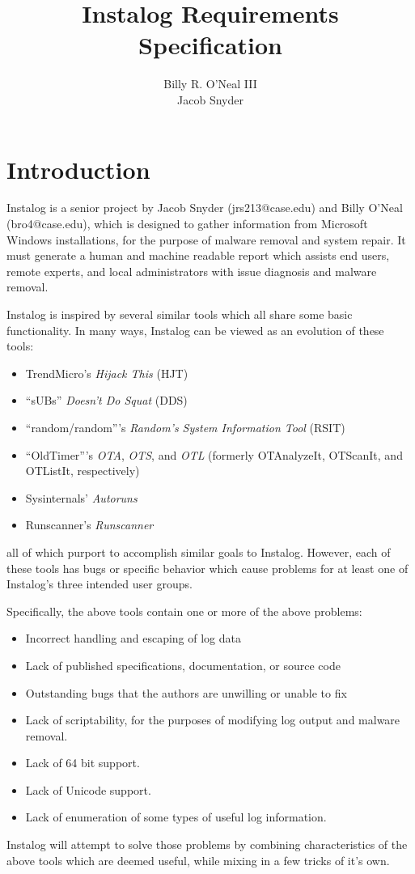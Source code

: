 \documentclass[letterpaper,12pt]{article}
\title{Instalog Requirements Specification}
\author{
Billy R. O'Neal III \\
Jacob Snyder
}
\begin{document}
\maketitle

\section{Introduction}
Instalog is a senior project by Jacob Snyder (jrs213@case.edu) and Billy O'Neal
(bro4@case.edu), which is designed to gather information from Microsoft Windows
installations, for the purpose of malware removal and system repair.  It must
generate a human and machine readable report which assists end users, remote
experts, and local administrators with issue diagnosis and malware removal.

Instalog is inspired by several similar tools which all share some basic
functionality.  In many ways, Instalog can be viewed as an evolution of
these tools:
\begin{itemize}
    \item TrendMicro's {\em Hijack This} (HJT)
    \item ``sUBs'' {\em Doesn't Do Squat} (DDS)
    \item ``random/random'''s {\em Random's System Information Tool} (RSIT)
    \item ``OldTimer'''s {\em OTA}, {\em OTS}, and {\em OTL} (formerly
    OTAnalyzeIt, OTScanIt, and OTListIt, respectively)
    \item Sysinternals' {\em Autoruns}
    \item Runscanner's {\em Runscanner}
\end{itemize}
all of which purport to accomplish similar goals to Instalog. However, each of
these tools has bugs or specific behavior which cause problems for at least one
of Instalog's three intended user groups.

Specifically, the above tools contain one or more of the above problems:
\begin{itemize}
    \item Incorrect handling and escaping of log data
    \item Lack of published specifications, documentation, or source code
    \item Outstanding bugs that the authors are unwilling or unable to fix
    \item Lack of scriptability, for the purposes of modifying log output and
    malware removal.
    \item Lack of 64 bit support.
    \item Lack of Unicode support.
    \item Lack of enumeration of some types of useful log information.
\end{itemize}
Instalog will attempt to solve those problems by combining characteristics of
the above tools which are deemed useful, while mixing in a few tricks of it's
own.
\end{document}
